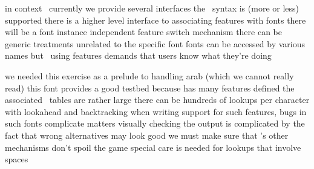 \StopSteps

\StopTopic


\StartSteps

\StartItem in context \MKIV\ currently we provide several interfaces \FlushStep \StopItem
\StartItem the \XETEX\ syntax is (more or less) supported \FlushStep \StopItem
\StartItem there is a higher level interface to associating features with fonts  \FlushStep \StopItem
\StartItem there will be a font instance independent feature switch mechanism \FlushStep \StopItem
\StartItem there can be generic treatments unrelated to the specific font \FlushStep \StopItem
\StartItem fonts can be accessed by various names \FlushStep \StopItem
\StartItem but \unknown\ using features demands that users know what they're doing \FlushStep \StopItem

\StopSteps

\StopTopic


\StartSteps

\StartItem we needed this exercise as a prelude to handling arab (which we cannot really read) \FlushStep \StopItem
\StartItem this font provides a good testbed because has many features defined \FlushStep \StopItem
\StartItem the associated \LUATEX\ tables are rather large \FlushStep \StopItem
\StartItem there can be hundreds of lookups per character with lookahead and backtracking \FlushStep \StopItem
\StartItem when writing support for such features, bugs in such fonts complicate matters \FlushStep \StopItem
\StartItem visually checking the output is complicated by the fact that wrong alternatives may look good \FlushStep \StopItem
\StartItem we must make sure that \TEX's other mechanisms don't spoil the game \FlushStep \StopItem
\StartItem special care is needed for lookups that involve spaces \FlushStep \StopItem

\StopSteps

\StopTopic

\page \start


